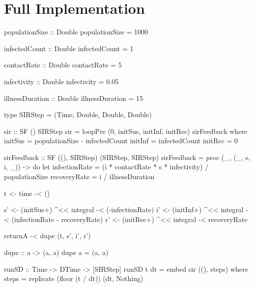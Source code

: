 \newpage

\section{Full Implementation}
\begin{HaskellCode}
populationSize :: Double
populationSize = 1000

infectedCount :: Double
infectedCount = 1

contactRate :: Double
contactRate = 5

infectivity :: Double
infectivity = 0.05

illnessDuration :: Double
illnessDuration = 15

type SIRStep = (Time, Double, Double, Double)

sir :: SF () SIRStep
sir = loopPre (0, initSus, initInf, initRec) sirFeedback
  where
    initSus = populationSize - infectedCount
    initInf = infectedCount
    initRec = 0

    sirFeedback :: SF ((), SIRStep) (SIRStep, SIRStep)
    sirFeedback = proc (_, (_, s, i, _)) -> do
      let infectionRate = (i * contactRate * s * infectivity) / populationSize
          recoveryRate  = i / illnessDuration

      t <- time -< ()

      s' <- (initSus+) ^<< integral -< (-infectionRate)
      i' <- (initInf+) ^<< integral -< (infectionRate - recoveryRate)
      r' <- (initRec+) ^<< integral -< recoveryRate

      returnA -< dupe (t, s', i', r')

    dupe :: a -> (a, a)
    dupe a = (a, a)

runSD :: Time -> DTime -> [SIRStep]
runSD t dt = embed sir ((), steps)
  where
    steps = replicate (floor (t / dt)) (dt, Nothing)
\end{HaskellCode}